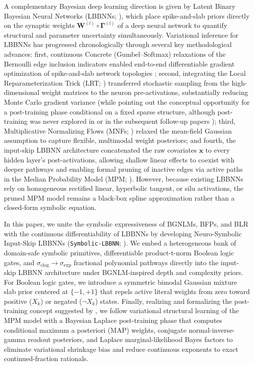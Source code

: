 \documentclass[11pt,a4paper]{article}
\begin{document}
A complementary Bayesian deep learning direction is given by Latent Binary Bayesian Neural Networks (LBBNNs; \citealp{hubin2024sparse, skaaret2024flows, skaaret2024input, skaaret2026lbbnn}), which place spike-and-slab priors directly on the synaptic weights $\bm{W}^{(l)} \circ \bm{\Gamma}^{(l)}$ of a deep neural network to quantify structural and parameter uncertainty simultaneously. Variational inference for LBBNNs has progressed chronologically through several key methodological advances: first, continuous Concrete (Gumbel--Softmax) relaxations of the Bernoulli edge inclusion indicators \citep{maddison2016concrete} enabled end-to-end differentiable gradient optimization of spike-and-slab network topologies \citep{hubin2024sparse}; second, integrating the Local Reparameterization Trick (LRT; \citealp{kingma2015variational, hubin2024sparse}) transferred stochastic sampling from the high-dimensional weight matrices to the neuron pre-activations, substantially reducing Monte Carlo gradient variance (while pointing out the conceptual opportunity for a post-training phase conditional on a fixed sparse structure, although post-training was never explored in \citealp{hubin2024sparse} or in the subsequent follow-up papers \citealp{skaaret2024flows, skaaret2024input}); third, Multiplicative Normalizing Flows (MNFs; \citealp{skaaret2024flows}) relaxed the mean-field Gaussian assumption to capture flexible, multimodal weight posteriors; and fourth, the input-skip LBBNN architecture \citep{skaaret2024input, skaaret2026lbbnn} concatenated the raw covariates $\bm{x}$ to every hidden layer's post-activations, allowing shallow linear effects to coexist with deeper pathways and enabling formal pruning of inactive edges via active paths in the Median Probability Model (MPM; \citealp{barbieri2004optimal}). However, because existing LBBNNs rely on homogeneous rectified linear, hyperbolic tangent, or silu activations, the pruned MPM model remains a black-box spline approximation rather than a closed-form symbolic equation.

In this paper, we unite the symbolic expressiveness of BGNLMs, BFPs, and BLR with the continuous differentiability of LBBNNs by developing Neuro-Symbolic Input-Skip LBBNNs (\texttt{Symbolic-LBBNN}; \citealp{hubin2026symbolicrepo}). We embed a heterogeneous bank of domain-safe symbolic primitives, differentiable product-t-norm Boolean logic gates, and $\sigma_{\text{clog}} \to \sigma_{\exp}$ fractional polynomial pathways directly into the input-skip LBBNN architecture under BGNLM-inspired depth and complexity priors. For Boolean logic gates, we introduce a symmetric bimodal Gaussian mixture slab prior centered at $\{-1, +1\}$ that repels active literal weights from zero toward positive ($X_k$) or negated ($\neg X_k$) states. Finally, realizing and formalizing the post-training concept suggested by \citet{hubin2024sparse}, we follow variational structural learning of the MPM model with a Bayesian Laplace post-training phase that computes conditional maximum a posteriori (MAP) weights, conjugate normal-inverse-gamma readout posteriors, and Laplace marginal-likelihood Bayes factors to eliminate variational shrinkage bias and reduce continuous exponents to exact continued-fraction rationals.
\end{document}
